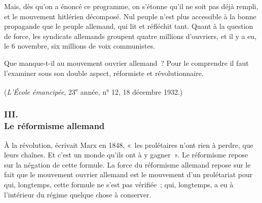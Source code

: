 \documentclass[french,twoside]{book} %
\begin{document}
Mais, dès qu'on a énoncé ce programme, on s'étonne qu'il ne soit pas déjà rempli, et le mouvement hitlérien décomposé. Nul peuple n'est plus accessible à la bonne propagande que le peuple allemand, qui lit et réfléchit tant. Quant à la question de force, les syndicats allemands groupent quatre millions d'ouvriers, et il y a eu, le 6 novembre, six millions de voix communistes.\par
Que manque-t-il au mouvement ouvrier allemand ? Pour le comprendre il faut l'examiner sous son double aspect, réformiste et révolutionnaire.\par
({\itshape L'École émancipée}, 23\textsuperscript{e} année, n° 12, 18 décembre 1932.)
\subsubsection[III. Le réformisme allemand]{III. \\
Le réformisme allemand}
\noindent À la révolution, écrivait Marx en 1848, « les prolétaires n'ont rien à perdre, que leurs chaînes. Et c'est un monde qu'ils ont à y gagner ». Le réformisme repose sur la négation de cette formule. La force du réformisme allemand repose sur le fait que le mouvement ouvrier allemand est le mouve­ment d'un prolétariat pour qui, longtemps, cette formule ne s'est pas vérifiée ; qui, longtemps, a eu à l'intérieur du régime quelque chose à conserver.\par
\par
\end{document}
